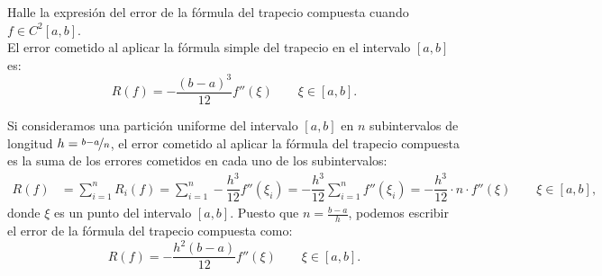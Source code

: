 \begin{ejercicio}\label{ej:2.1.15}
    Halle la expresión del error de la fórmula del trapecio compuesta cuando $f \in C^2[a, b]$.\\

    El error cometido al aplicar la fórmula simple del trapecio en el intervalo $[a, b]$ es:
    \begin{equation*}
        R(f) = -\dfrac{(b-a)^3}{12} f''(\xi)\qquad \xi \in [a, b].
    \end{equation*}

    Si consideramos una partición uniforme del intervalo $[a, b]$ en $n$ subintervalos de longitud $h = \nicefrac{b-a}{n}$, el error cometido al aplicar la fórmula del trapecio compuesta es la suma de los errores cometidos en cada uno de los subintervalos:
    \begin{align*}
        R(f) &= \sum_{i=1}^{n} R_i(f) = \sum_{i=1}^{n} -\dfrac{h^3}{12} f''(\xi_i) = -\dfrac{h^3}{12} \sum_{i=1}^{n} f''(\xi_i)
        = -\dfrac{h^3}{12}\cdot n\cdot f''(\xi)\qquad \xi \in [a, b],
    \end{align*}
    donde $\xi$ es un punto del intervalo $[a, b]$. Puesto que $n = \frac{b-a}{h}$, podemos escribir el error de la fórmula del trapecio compuesta como:
    \begin{equation*}
        R(f) = -\dfrac{h^2(b-a)}{12} f''(\xi)\qquad \xi \in [a, b].
    \end{equation*}
\end{ejercicio}

